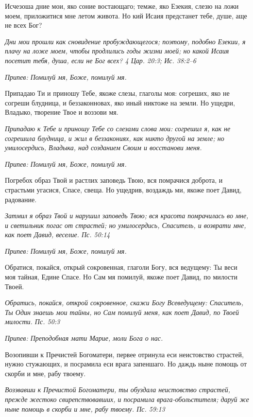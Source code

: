 Исчезоша дние мои, яко соние востающаго; темже, яко Езекия, слезю на ложи моем, приложитися мне летом живота. Но кий Исаия предстанет тебе, душе, аще не всех Бог?


\itshape Дни мои прошли как сновидение пробуждающегося; поэтому, подобно Езекии, я плачу на ложе моем, чтобы продлились годы жизни моей; но какой Исаия посетит тебя, душа, если не Бог всех? 4 Цар. 20:3; Ис. 38:2–6\normalfont{}


\itshape Припев:\normalfont{} Помилуй мя, Боже, помилуй мя.


Припадаю Ти и приношу Тебе, якоже слезы, глаголы моя: согреших, яко не согреши блудница, и беззаконновах, яко иный никтоже на земли. Но ущедри, Владыко, творение Твое и воззови мя.


\itshape Припадаю к Тебе и приношу Тебе со слезами слова мои: согрешил я, как не согрешила блудница, и жил в беззакониях, как никто другой на земле; но умилосердись, Владыка, над созданием Своим и восстанови меня.\normalfont{}


\itshape Припев:\normalfont{} Помилуй мя, Боже, помилуй мя.


Погребох образ Твой и растлих заповедь Твою, вся помрачися доброта, и страстьми угасися, Спасе, свеща. Но ущедрив, воздаждь ми, якоже поет Давид, радование.


\itshape Затмил я образ Твой и нарушил заповедь Твою; вся красота помрачилась во мне, и светильник погас от страстей; но умилосердись, Спаситель, и возврати мне, как поет Давид, веселие. Пс. 50:14\normalfont{}


\itshape Припев:\normalfont{} Помилуй мя, Боже, помилуй мя.


Обратися, покайся, открый сокровенная, глаголи Богу, вся ведущему: Ты веси моя тайная, Едине Спасе. Но Сам мя помилуй, якоже поет Давид, по милости Твоей.


\itshape Обратись, покайся, открой сокровенное, скажи Богу Всеведущему: Спаситель, Ты Один знаешь мои тайны, но Сам помилуй меня, как поет Давид, по Твоей милости. Пс. 50:3\normalfont{}


\itshape Припев:\normalfont{} Преподобная мати Марие, моли Бога о нас.


Возопивши к Пречистей Богоматери, первее отринула еси неистовство страстей, нужно стужающих, и посрамила еси врага запеншаго. Но даждь ныне помощь от скорби и мне, рабу твоему.


\itshape Воззвавши к Пречистой Богоматери, ты обуздала неистовство страстей, прежде жестоко свирепствовавших, и посрамила врага-обольстителя; даруй же ныне помощь в скорби и мне, рабу твоему. Пс. 59:13\normalfont{}


